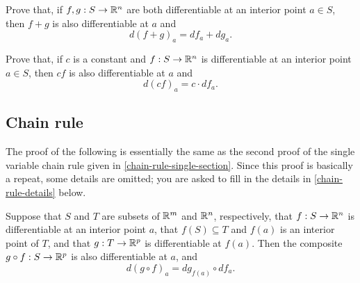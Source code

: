 \begin{exercise} \label{sum-rule} 
	Prove that, if $f, g : S \to \mathbb{R}^n$ are both differentiable at an interior point $a \in S$, then $f + g$ is also differentiable at $a$ and \[ d(f+g)_a = df_a + dg_a. \]
\end{exercise}

\begin{exercise} \label{scalar-multiples-rule} 
	Prove that, if $c$ is a constant and $f : S \to \mathbb{R}^n$ is differentiable at an interior point $a \in S$, then $cf$ is also differentiable at $a$ and \[ d(cf)_a = c \cdot df_a. \]
\end{exercise}

\subsection{Chain rule}

The proof of the following is essentially the same as the second proof of the single variable chain rule given in \cref{chain-rule-single-section}. Since this proof is basically a repeat, some details are omitted; you are asked to fill in the details in \cref{chain-rule-details} below. 

\begin{theorem} \label{chain-rule} 
	Suppose that $S$ and $T$ are subsets of $\mathbb{R}^m$ and $\mathbb{R}^n$, respectively, that $f : S \to \mathbb{R}^n$ is differentiable at an interior point $a$, that $f(S) \subseteq T$ and $f(a)$ is an interior point of $T$, and that $g : T \to \mathbb{R}^p$ is differentiable at $f(a)$. Then the composite $g \circ f : S \to \mathbb{R}^p$ is also differentiable at $a$, and 
	\[ d(g \circ f)_a = dg_{f(a)} \circ df_a. \]
\end{theorem}

